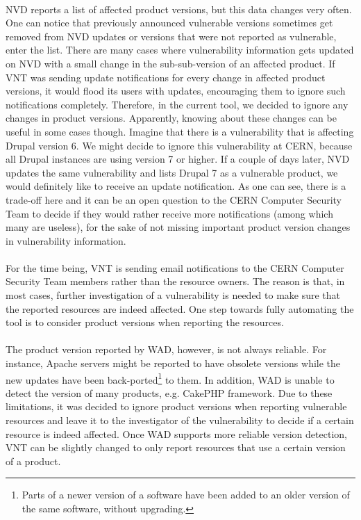 \paragraph{}
NVD reports a list of affected product versions, but this data changes very often. One can notice that previously announced vulnerable versions sometimes get removed from NVD updates or versions that were not reported as vulnerable, enter the list. There are many cases where vulnerability information gets updated on NVD with a small change in the sub-sub-version of an affected product. If VNT was sending update notifications for every change in affected product versions, it would flood its users with updates, encouraging them to ignore such notifications completely. Therefore, in the current tool, we decided to ignore any changes in product versions. Apparently, knowing about these changes can be useful in some cases though. Imagine that there is a vulnerability that is affecting Drupal version 6. We might decide to ignore this vulnerability at CERN, because all Drupal instances are using version 7 or higher. If a couple of days later, NVD updates the same vulnerability and lists Drupal 7 as a vulnerable product, we would definitely like to receive an update notification. As one can see, there is a trade-off here and it can be an open question to the CERN Computer Security Team to decide if they would rather receive more notifications (among which many are useless), for the sake of not missing important product version changes in vulnerability information.
\paragraph{}
For the time being, VNT is sending email notifications to the CERN Computer Security Team members rather than the resource owners. The reason is that, in most cases, further investigation of a vulnerability is needed to make sure that the reported resources are indeed affected. One step towards fully automating the tool is to consider product versions when reporting the resources.
\paragraph{}
The product version reported by WAD, however, is not always reliable. For instance, Apache servers might be reported to have obsolete versions while the new updates have been back-ported\footnote{Parts of a newer version of a software have been added to an older version of the same software, without upgrading.} to them. In addition, WAD is unable to detect the version of many products, e.g. CakePHP framework. Due to these limitations, it was decided to ignore product versions when reporting vulnerable resources and leave it to the investigator of the vulnerability to decide if a certain resource is indeed affected. Once WAD supports more reliable version detection, VNT can be slightly changed to only report resources that use a certain version of a product.
